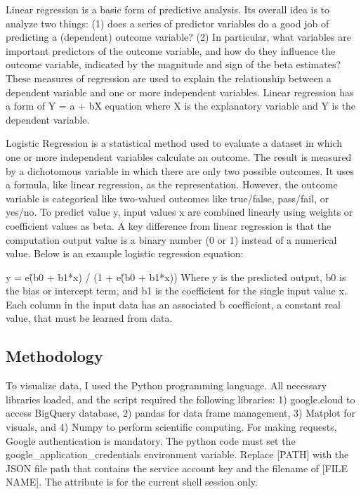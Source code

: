 \documentclass[conference]{IEEEtran}
\begin{document}
Linear regression is a basic form of predictive analysis. Its overall idea is to analyze two things: (1) does a series of predictor variables do a good job of predicting a (dependent) outcome variable? (2) In particular, what variables are important predictors of the outcome variable, and how do they influence the outcome variable, indicated by the magnitude and sign of the beta estimates? These measures of regression are used to explain the relationship between a dependent variable and one or more independent variables.  Linear regression has a form of Y = a + bX equation where X is the explanatory variable and Y is the dependent variable.

Logistic Regression is a statistical method used to evaluate a dataset in which one or more independent variables calculate an outcome. The result is measured by a dichotomous variable in which there are only two possible outcomes. It uses a formula, like linear regression, as the representation. However, the outcome variable is categorical like two-valued outcomes like true/false, pass/fail, or yes/no. To predict value y, input values x are combined linearly using weights or coefficient values as beta. A key difference from linear regression is that the computation output value is a binary number (0 or 1) instead of a numerical value.  Below is an example logistic regression equation:

 
y = e\^ (b0 + b1*x) / (1 + e\^(b0 + b1*x))
\newline 
\newline
Where y is the predicted output, b0 is the bias or intercept term, and b1 is the coefficient for the single input value x. Each column in the input data has an associated b coefficient, a constant real value, that must be learned from data.
%
%
%
\subsection{Methodology}
To visualize data, I used the Python programming language.  All necessary libraries loaded, and the script required the following libraries: 1) google.cloud to access BigQuery database, 2) pandas for data frame management, 3) Matplot for visuals, and 4) Numpy to perform scientific computing.  For making requests, Google authentication is mandatory. The python code must set the google\_application\_credentials environment variable. Replace [PATH] with the JSON file path that contains the service account key and the filename of [FILE NAME]. The attribute is for the current shell session only.
\end{document}
